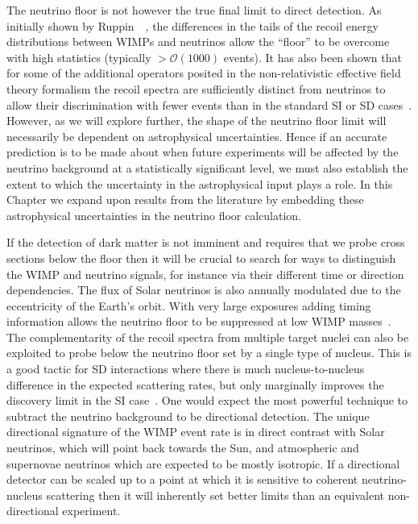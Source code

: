 The neutrino floor is not however the true final limit to direct detection. As initially shown by Ruppin~\etal~\cite{Ruppin:2014bra}, the differences in the tails of the recoil energy distributions between WIMPs and neutrinos allow the ``floor'' to be overcome with high statistics (typically $>\mathcal{O}(1000)$ events). It has also been shown that for some of the additional operators posited in the non-relativistic effective field theory formalism the recoil spectra are sufficiently distinct from neutrinos to allow their discrimination with fewer events than in the standard SI or SD cases~\cite{Dent:2016iht,Dent:2016wor}. However, as we will explore further, the shape of the neutrino floor limit will necessarily be dependent on astrophysical uncertainties. Hence if an accurate prediction is to be made about when future experiments will be affected by the neutrino background at a statistically significant level, we must also establish the extent to which the uncertainty in the astrophysical input plays a role. In this Chapter we expand upon results from the literature by embedding these astrophysical uncertainties in the neutrino floor calculation.

If the detection of dark matter is not imminent and requires that we probe cross sections below the floor then it will be crucial to search for ways to distinguish the WIMP and neutrino signals, for instance via their different time or direction dependencies. The flux of Solar neutrinos is also annually modulated due to the eccentricity of the Earth's orbit. With very large exposures adding timing information allows the neutrino floor to be suppressed at low WIMP masses~\cite{Davis:2014ama}. The complementarity of the recoil spectra from multiple target nuclei can also be exploited to probe below the neutrino floor set by a single type of nucleus. This is a good tactic for SD interactions where there is much nucleus-to-nucleus difference in the expected scattering rates, but only marginally improves the discovery limit in the SI case~\cite{Ruppin:2014bra}. One would expect the most powerful technique to subtract the neutrino background to be directional detection. The unique directional signature of the WIMP event rate is in direct contrast with Solar neutrinos, which will point back towards the Sun, and atmospheric and supernovae neutrinos which are expected to be mostly isotropic. If a directional detector can be scaled up to a point at which it is sensitive to coherent neutrino-nucleus scattering then it will inherently set better limits than an equivalent non-directional experiment.

